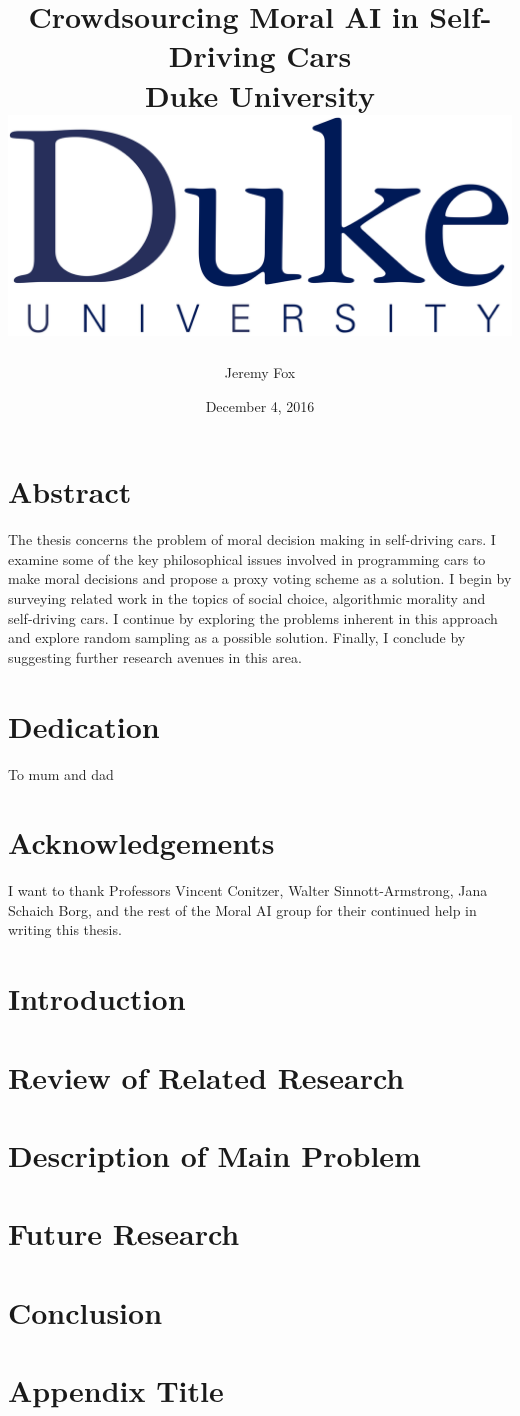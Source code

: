 \documentclass[12pt]{report}
\title{
	{Crowdsourcing Moral AI in Self-Driving Cars}\\
	{\large Duke University}\\
	{\includegraphics[width=\textwidth]{duke.png}}
}
\author{Jeremy Fox}
\date{December 4, 2016}
\begin{document}
\maketitle




\chapter*{Abstract}
The thesis concerns the problem of moral decision making in self-driving cars. I examine some of the key philosophical issues involved in programming cars to make moral decisions and propose a proxy voting scheme as a solution. I begin by surveying related work in the topics of social choice, algorithmic morality and self-driving cars. I continue by exploring the problems inherent in this approach and explore random sampling as a possible solution. Finally, I conclude by suggesting further research avenues in this area.

\chapter*{Dedication}
To mum and dad

\chapter*{Acknowledgements}
I want to thank Professors Vincent Conitzer, Walter Sinnott-Armstrong, Jana Schaich Borg, and the rest of the Moral AI group for their continued help in writing this thesis.

\tableofcontents

\chapter{Introduction}


\chapter{Review of Related Research}


\chapter{Description of Main Problem}


\chapter{Future Research}


\chapter{Conclusion}


\appendix
\chapter{Appendix Title}




{}

\end{document}
